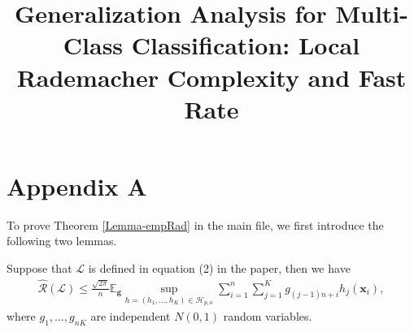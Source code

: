 \documentclass[10pt]{llncs}
\begin{document}
\mainmatter  %







\title{Generalization Analysis for Multi-Class Classification: Local Rademacher Complexity and Fast Rate}
\author{}
\institute{}

\maketitle
\section{Appendix A}
To prove Theorem \ref{Lemma-empRad} in the main file, we first introduce the following two lemmas.
\begin{lemma}
\label{hatRLlemma}
Suppose that $\mathcal{L}$ is defined in equation \textrm{(2)} in the paper,
then we have
\begin{align*}
  \hat{\mathcal{R}}(\mathcal{L})\leq\frac{\sqrt{2\pi}}{n}\mathbb{E}_{\mathbf g}\sup_{h=(h_1,\ldots,h_K)
  \in\mathcal{H}_{p,\kappa}}\sum_{i=1}^n\sum_{j=1}^Kg_{(j-1)n+i}h_j(\mathbf x_i),
\end{align*}
 where $g_1,\ldots,g_{nK}$ are  independent $N(0,1)$ random variables.
\end{lemma}
\end{document}
